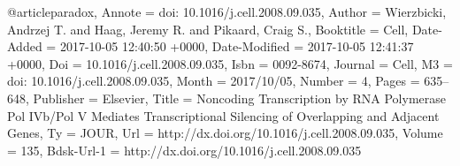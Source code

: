 
@article{paradox,
	Annote = {doi: 10.1016/j.cell.2008.09.035},
	Author = {Wierzbicki, Andrzej T. and Haag, Jeremy R. and Pikaard, Craig S.},
	Booktitle = {Cell},
	Date-Added = {2017-10-05 12:40:50 +0000},
	Date-Modified = {2017-10-05 12:41:37 +0000},
	Doi = {10.1016/j.cell.2008.09.035},
	Isbn = {0092-8674},
	Journal = {Cell},
	M3 = {doi: 10.1016/j.cell.2008.09.035},
	Month = {2017/10/05},
	Number = {4},
	Pages = {635--648},
	Publisher = {Elsevier},
	Title = {Noncoding Transcription by RNA Polymerase Pol IVb/Pol V Mediates Transcriptional Silencing of Overlapping and Adjacent Genes},
	Ty = {JOUR},
	Url = {http://dx.doi.org/10.1016/j.cell.2008.09.035},
	Volume = {135},
	Bdsk-Url-1 = {http://dx.doi.org/10.1016/j.cell.2008.09.035}}

